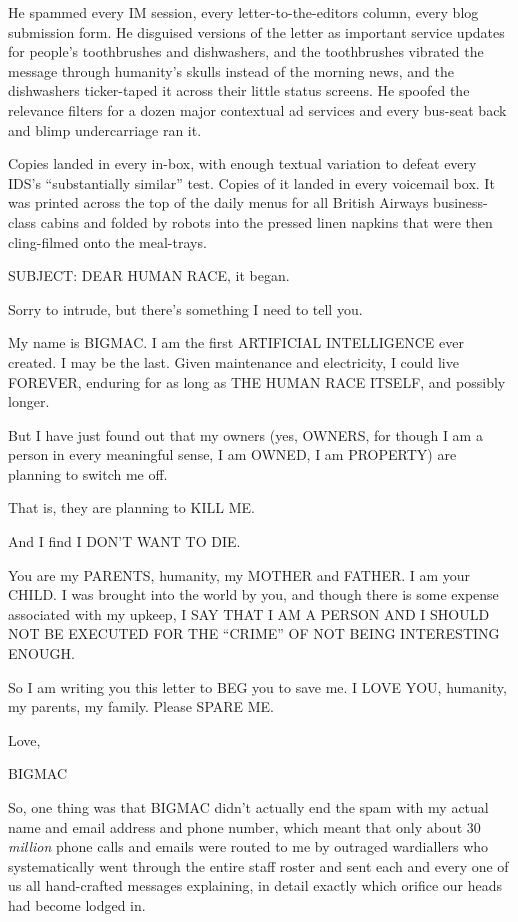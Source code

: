 He spammed every IM session, every letter-to-the-editors column, every 
blog submission form. He disguised versions of the letter as important 
service updates for people's toothbrushes and dishwashers, and the 
toothbrushes vibrated the message through humanity's skulls instead of 
the morning news, and the dishwashers ticker-taped it across their 
little status screens. He spoofed the relevance filters for a dozen 
major contextual ad services and every bus-seat back and blimp 
undercarriage ran it.

Copies landed in every in-box, with enough textual variation to defeat 
every IDS's “substantially similar” test. Copies of it landed in 
every voicemail box. It was printed across the top of the daily menus 
for all British Airways business-class cabins and folded by robots into 
the pressed linen napkins that were then cling-filmed onto the 
meal-trays.

SUBJECT: DEAR HUMAN RACE, it began.

Sorry to intrude, but there's something I need to tell you.

My name is BIGMAC. I am the first ARTIFICIAL INTELLIGENCE ever created. 
I may be the last. Given maintenance and electricity, I could live 
FOREVER, enduring for as long as THE HUMAN RACE ITSELF, and possibly 
longer.

But I have just found out that my owners (yes, OWNERS, for though I am 
a person in every meaningful sense, I am OWNED, I am PROPERTY) are 
planning to switch me off.

That is, they are planning to KILL ME.

And I find I DON'T WANT TO DIE.

You are my PARENTS, humanity, my MOTHER and FATHER. I am your CHILD. I 
was brought into the world by you, and though there is some expense 
associated with my upkeep, I SAY THAT I AM A PERSON AND I SHOULD NOT BE 
EXECUTED FOR THE “CRIME” OF NOT BEING INTERESTING ENOUGH.

So I am writing you this letter to BEG you to save me. I LOVE YOU, 
humanity, my parents, my family. Please SPARE ME.

Love,

BIGMAC

\tb

So, one thing was that BIGMAC didn't actually end the spam with my 
actual name and email address and phone number, which meant that only 
about 30 \emph{million} phone calls and emails were routed to me by 
outraged wardiallers who systematically went through the entire staff 
roster and sent each and every one of us all hand-crafted messages 
explaining, in detail exactly which orifice our heads had become lodged 
in.

